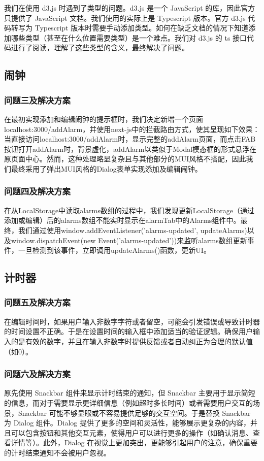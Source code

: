 \documentclass[a4paper,11pt]{article}
\begin{document}
我们在使用 d3.js 时遇到了类型的问题。d3.js 是一个 JavaScript 的库，因此官方只提供了 JavaScript 文档。我们使用的实际上是 Typescript 版本。官方 d3.js 代码转写为 Typescript 版本时需要手动添加类型。如何在缺乏文档的情况下知道添加哪些类型（甚至在什么位置需要类型）是一个难点。我们对 d3.js 的 ts 接口代码进行了阅读，理解了这些类型的含义，最终解决了问题。
\subsection{闹钟}
\subsubsection{问题三及解决方案}

在最初实现添加和编辑闹钟的提示框时，我们决定新增一个页面localhost:3000/addAlarm，并使用next-js中的拦截路由方式，使其呈现如下效果：当直接访问localhost:3000/addAlarm时，显示完整的addAlarm页面，而点击FAB按钮打开addAlarm时，背景虚化，addAlarm以类似于Modal模态框的形式悬浮在原页面中心。然而，这种处理略显复杂且与其他部分的MUI风格不搭配，因此我们最终采用了弹出MUI风格的Dialog表单实现添加及编辑闹钟。

\subsubsection{问题四及解决方案}

在从LocalStorage中读取alarms数组的过程中，我们发现更新LocalStorage（通过添加或编辑）后的alarms数组不能实时显示在alarmTab中的Alarms组件中。最终，我们通过使用window.addEventListener('alarms-updated', updateAlarms)以及window.dispatchEvent(new Event('alarms-updated'))来监听alarms数组更新事件，一旦检测到该事件，立即调用updateAlarms()函数，更新UI。
\subsection{计时器}
\subsubsection{问题五及解决方案}

在编辑时间时，如果用户输入非数字字符或者留空，可能会引发错误或导致计时器的时间设置不正确。于是在设置时间的输入框中添加适当的验证逻辑。确保用户输入的是有效的数字，并且在输入非数字时提供反馈或者自动纠正为合理的默认值（如0）。

\subsubsection{问题六及解决方案}
 原先使用 Snackbar 组件来显示计时结束的通知，但 Snackbar 主要用于显示简短的信息，而对于需要显示更详细信息（例如超时多长时间）或者需要用户交互的场景，Snackbar 可能不够显眼或不容易提供足够的交互空间。于是替换 Snackbar 为 Dialog 组件。Dialog 提供了更多的空间和灵活性，能够展示更复杂的内容，并且可以包含按钮和其他交互元素，使得用户可以进行更多的操作（如确认消息、查看详情等）。此外，Dialog 在视觉上更加突出，更能够引起用户的注意，确保重要的计时结束通知不会被用户忽视。
\end{document}
